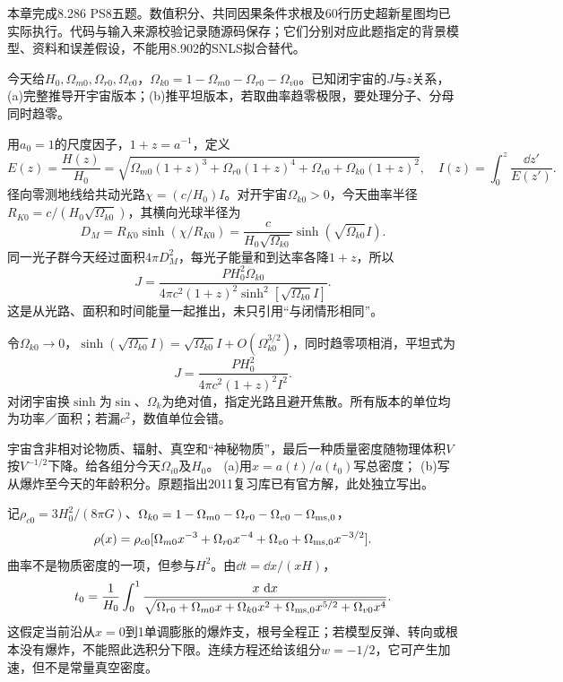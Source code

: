 本章完成8.286 PS8五题。数值积分、共同因果条件求根及60行历史超新星图均已实际执行。代码与输入来源校验记录随源码保存；它们分别对应此题指定的背景模型、资料和误差假设，不能用8.902的SNLS拟合替代。

\begin{exercise}
今天给$H_0,\Omega_{m0},\Omega_{r0},\Omega_{v0}$，$\Omega_{k0}=1-\Omega_{m0}-\Omega_{r0}-\Omega_{v0}$。已知闭宇宙的$J$与$z$关系，(a)完整推导开宇宙版本；(b)推平坦版本，若取曲率趋零极限，要处理分子、分母同时趋零。
\end{exercise}
\begin{solution}
用$a_0=1$的尺度因子，$1+z=a^{-1}$，定义
\[
 E(z)=\frac{H(z)}{H_0}
 =\sqrt{\Omega_{m0}(1+z)^3+\Omega_{r0}(1+z)^4+
 \Omega_{v0}+\Omega_{k0}(1+z)^2},\quad
 I(z)=\int_0^z\frac{\dd z'}{E(z')}.
\]
径向零测地线给共动光路$\chi=(c/H_0)I$。对开宇宙$\Omega_{k0}>0$，今天曲率半径$R_{K0}=c/(H_0\sqrt{\Omega_{k0}})$，其横向光球半径为
\[
 D_M=R_{K0}\sinh(\chi/R_{K0})
 =\frac c{H_0\sqrt{\Omega_{k0}}}\sinh(\sqrt{\Omega_{k0}}I).
\]
同一光子群今天经过面积$4\pi D_M^2$，每光子能量和到达率各降$1+z$，所以
\[
 J=\frac{PH_0^2\Omega_{k0}}
 {4\pi c^2(1+z)^2\sinh^2[\sqrt{\Omega_{k0}}I]}.
\]
这是从光路、面积和时间能量一起推出，未只引用“与闭情形相同”。

令$\Omega_{k0}\to0$，$\sinh(\sqrt{\Omega_{k0}}I)=\sqrt{\Omega_{k0}}I+O(\Omega_{k0}^{3/2})$，同时趋零项相消，平坦式为
\[
 J=\frac{PH_0^2}{4\pi c^2(1+z)^2I^2}.
\]
对闭宇宙换$\sinh$为$\sin$、$\Omega_k$为绝对值，指定光路且避开焦散。所有版本的单位均为功率／面积；若漏$c^2$，数值单位会错。
\end{solution}

\begin{exercise}
宇宙含非相对论物质、辐射、真空和“神秘物质”，最后一种质量密度随物理体积$V$按$V^{-1/2}$下降。给各组分今天$\Omega_{i0}$及$H_0$。
(a)用$x=a(t)/a(t_0)$写总密度；
(b)写从爆炸至今天的年龄积分。原题指出2011复习库已有官方解，此处独立写出。
\end{exercise}
\begin{solution}
记$\rho_{c0}=3H_0^2/(8\pi G)$、$\Omega_{k0}=1-\Omega_{m0}-\Omega_{r0}-\Omega_{v0}-\Omega_{{\rm ms},0}$，
\[
 \rho(x)=\rho_{c0}
 [\Omega_{m0}x^{-3}+\Omega_{r0}x^{-4}
 +\Omega_{v0}+\Omega_{{\rm ms},0}x^{-3/2}].
\]
曲率不是物质密度的一项，但参与$H^2$。由$\dd t=\dd x/(xH)$，
\[
 t_0=\frac1{H_0}\int_0^1
 \frac{x\,\,\mathrm d x}
 {\sqrt{\Omega_{r0}+\Omega_{m0}x+\Omega_{k0}x^2+
 \Omega_{{\rm ms},0}x^{5/2}+\Omega_{v0}x^4}}.
\]
这假定当前沿从$x=0$到1单调膨胀的爆炸支，根号全程正；若模型反弹、转向或根本没有爆炸，不能照此选积分下限。连续方程还给该组分$w=-1/2$，它可产生加速，但不是常量真空密度。
\end{solution}

